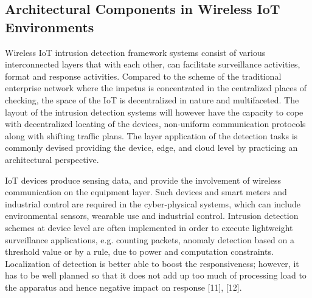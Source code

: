 \documentclass[12pt]{article}
\begin{document}
\subsection{Architectural Components in Wireless IoT Environments}	
Wireless IoT intrusion detection framework systems consist of various interconnected layers that with each other, can facilitate surveillance activities, format and response activities. Compared to the scheme of the traditional enterprise network where the impetus is concentrated in the centralized places of checking, the space of the IoT is decentralized in nature and multifaceted. The layout of the intrusion detection systems will however have the capacity to cope with decentralized locating of the devices, non-uniform communication protocols along with shifting traffic plans. The layer application of the detection tasks is commonly devised providing the device, edge, and cloud level by practicing an architectural perspective.















IoT devices produce sensing data, and provide the involvement of wireless communication on the equipment layer. Such devices and smart meters and industrial control are required in the cyber-physical systems, which can include environmental sensors, wearable use and industrial control. Intrusion detection schemes at device level are often implemented in order to execute lightweight surveillance applications, e.g. counting packets, anomaly detection based on a threshold value or by a rule, due to power and computation constraints. Localization of detection is better able to boost the responsiveness; however, it has to be well planned so that it does not add up too much of processing load to the apparatus and hence negative impact on response [11], [12].
\end{document}
